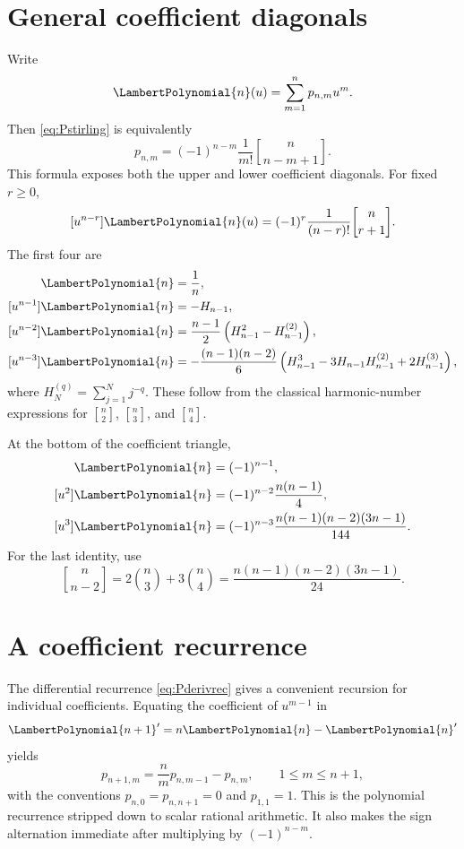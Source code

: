 \documentclass[11pt,oneside,openany]{book}
\newcommand{\UnsignedStirlingFirstKind}[2]{%
  \genfrac{[}{]}{0pt}{}{#1}{#2}%
}
\begin{document}
\section{General coefficient diagonals}
Write
\[
 \LambertPolynomial{n}(u)=\sum_{m=1}^np_{n,m}u^m.
\]
Then \cref{eq:Pstirling} is equivalently
\begin{equation}\label{eq:pnmappendix}
 p_{n,m}=(-1)^{n-m}\frac{1}{m!}
 \UnsignedStirlingFirstKind{n}{n-m+1}.
\end{equation}
This formula exposes both the upper and lower coefficient diagonals.
For fixed \(r\geq0\),
\begin{equation}\label{eq:upperdiagonal}
 [u^{n-r}]\LambertPolynomial{n}(u)
 =(-1)^r\frac{1}{(n-r)!}\UnsignedStirlingFirstKind{n}{r+1}.
\end{equation}
The first four are
\begin{align}
 [u^n]\LambertPolynomial{n}&=\frac1n,
 \label{eq:diagtop0}\\
 [u^{n-1}]\LambertPolynomial{n}&=-H_{n-1},
 \label{eq:diagtop1}\\
 [u^{n-2}]\LambertPolynomial{n}
 &=\frac{n-1}{2}\left(H_{n-1}^2-H_{n-1}^{(2)}\right),
 \label{eq:diagtop2}\\
 [u^{n-3}]\LambertPolynomial{n}
 &=-\frac{(n-1)(n-2)}{6}
 \left(H_{n-1}^3-3H_{n-1}H_{n-1}^{(2)}
       +2H_{n-1}^{(3)}\right),
 \label{eq:diagtop3}
\end{align}
where
\(H_N^{(q)}=\sum_{j=1}^Nj^{-q}\).
These follow from the classical harmonic-number expressions for
\(\UnsignedStirlingFirstKind{n}{2}\), \(\UnsignedStirlingFirstKind{n}{3}\), and
\(\UnsignedStirlingFirstKind{n}{4}\).

At the bottom of the coefficient triangle,
\begin{align}
 [u]\LambertPolynomial{n}&=(-1)^{n-1},
 \label{eq:diagbottom1}\\
 [u^2]\LambertPolynomial{n}&=(-1)^{n-2}\frac{n(n-1)}4,
 \label{eq:diagbottom2}\\
 [u^3]\LambertPolynomial{n}&=(-1)^{n-3}
 \frac{n(n-1)(n-2)(3n-1)}{144}.
 \label{eq:diagbottom3}
\end{align}
For the last identity, use
\[
 \UnsignedStirlingFirstKind{n}{n-2}
 =2\binom n3+3\binom n4
 =\frac{n(n-1)(n-2)(3n-1)}{24}.
\]

\section{A coefficient recurrence}
The differential recurrence \cref{eq:Pderivrec} gives a convenient recursion
for individual coefficients.  Equating the coefficient of \(u^{m-1}\) in
\[
 \LambertPolynomial{n+1}'=n\LambertPolynomial{n}-\LambertPolynomial{n}'
\]
yields
\begin{equation}\label{eq:pnmrecurrence}
 p_{n+1,m}
 =\frac{n}{m}p_{n,m-1}-p_{n,m},
 \qquad 1\leq m\leq n+1,
\end{equation}
with the conventions \(p_{n,0}=p_{n,n+1}=0\) and \(p_{1,1}=1\).
This is the polynomial recurrence stripped down to scalar rational arithmetic.
It also makes the sign alternation immediate after multiplying by
\((-1)^{n-m}\).
\end{document}
